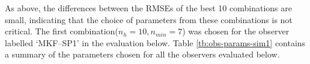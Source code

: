 

As above, the differences between the \gls{RMSE}s of the best 10 combinations are small, indicating that the choice of parameters from these combinations is not critical. The first combination($n_h=10,n_{min}=7$) was chosen for the observer labelled `MKF--SP1' in the evaluation below. Table \ref{tb:obs-params-sim1} contains a summary of the parameters chosen for all the observers evaluated below.

